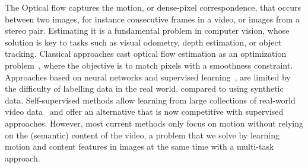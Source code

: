 \documentclass{article} %
\begin{document}
The Optical flow captures the motion, or dense-pixel correspondence, that occurs between two images, for instance consecutive frames in a video, or images from a stereo pair. Estimating it is a fundamental problem in computer vision, whose solution is key to tasks such as visual odometry, depth estimation, or object tracking. Classical approaches cast optical flow estimation as an optimization problem~\citep{horn1981flow, brox2004warping}, where the objective is to match pixels with a smoothness constraint. Approaches based on neural networks and supervised learning~\citep{yu2016flownet, ilg2017flownet2, hui2018liteflownet, sun2018pwcnet, yang2019vcn, zhao2020mashflownet, teed2020raft, jiang2021gma, bai2022dqflow}, are limited by the difficulty of labelling data in the real world, compared to using synthetic data. Self-supervised methods allow learning from large collections of real-world video data~\citep{ren2017dstflow, liu2019selflow, lui2019ddflow, zhong2019epiflow, im2020unsupsimflow, liu2020arflow, luo2021upflow, jonschkowski2020uflow, stone2021smurf} and offer an alternative that is now competitive with supervised approaches. However, most current methods only focus on motion without relying on the (semantic) content of the video, a problem that we solve by learning motion and content features in images at the same time with a multi-task approach.
\end{document}
